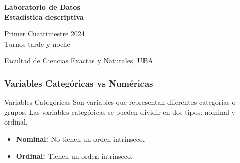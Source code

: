 \documentclass[aspectratio=169,12pt]{beamer}
\begin{document}

\begin{frame}

 \begin{center}

\Large\textbf{Laboratorio de Datos} \\
\large\textbf{Estadística descriptiva}




\vspace{1cm}
Primer Cuatrimestre 2024 \\ Turnos tarde y noche

\vspace{1cm}


 {\small Facultad de Ciencias Exactas y Naturales, UBA}
 \end{center}


\end{frame}


\begin{frame}
\frametitle{Variables Categóricas vs Numéricas}
\begin{block}{Variables Categóricas}
Son variables que representan diferentes categorías o grupos. 
Las variables categóricas se pueden dividir en dos tipos: nominal y ordinal.
\begin{itemize}
    \item \textbf{Nominal:} No tienen un orden intrínseco.
    \item \textbf{Ordinal:} Tienen un orden intrínseco.
\end{itemize}
\end{block}
\end{frame}

\end{document}
